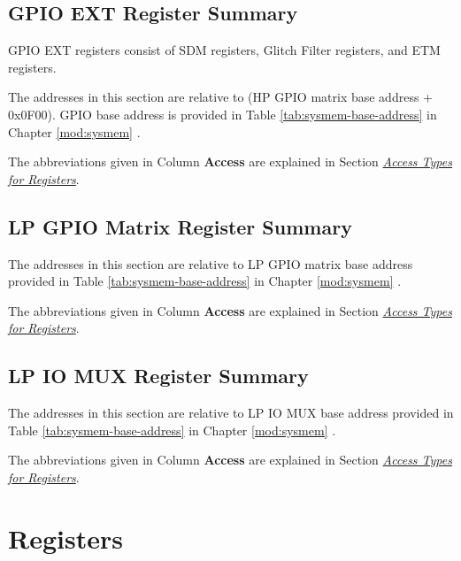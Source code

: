 \documentclass[main\_\_EN.tex]{subfiles}
\begin{document}



\subsection{GPIO EXT Register Summary}

GPIO EXT registers consist of SDM registers, Glitch Filter registers, and ETM registers.

The addresses in this section are relative to (HP GPIO matrix base address + 0x0F00). GPIO base address is provided in Table \ref{tab:sysmem-base-address} in Chapter \ref{mod:sysmem} \textit{}.

The abbreviations given in Column \textbf{Access} are explained in Section \hyperref[glossary-access-types]{\textit{Access Types for Registers}}.



\subsection{LP GPIO Matrix Register Summary}
\label{sec:lp-gpio-register-summ}
The addresses in this section are relative to LP GPIO matrix base address provided in Table \ref{tab:sysmem-base-address} in Chapter \ref{mod:sysmem} \textit{}.

The abbreviations given in Column \textbf{Access} are explained in Section \hyperref[glossary-access-types]{\textit{Access Types for Registers}}.



\subsection{LP IO MUX Register Summary}
\label{sec:lp-iomux-register-summ}

The addresses in this section are relative to LP IO MUX base address provided in Table \ref{tab:sysmem-base-address} in Chapter \ref{mod:sysmem} \textit{}.

The abbreviations given in Column \textbf{Access} are explained in Section \hyperref[glossary-access-types]{\textit{Access Types for Registers}}.



\section{Registers}
\end{document}
